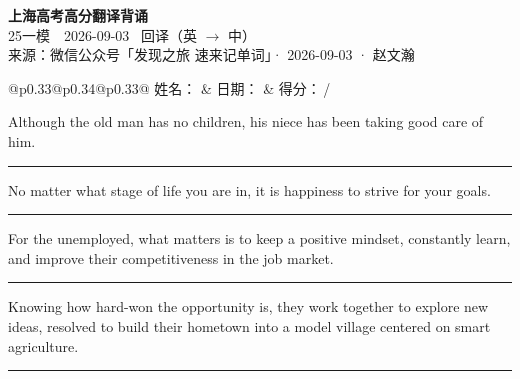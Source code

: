\documentclass[11pt,a4paper]{article}
\newcommand{\num}[1]{\makebox[1.9em][r]{#1.}\hspace{0.3em}}
\newcommand{\wline}{\noindent\rule{\linewidth}{0.4pt}}
\begin{document}
\pagestyle{plain}
\begin{center}
{\LARGE\bfseries 上海高考高分翻译背诵 }\\[0.25em]
{\large 25一模　2026-09-03 \quad\ 回译（英 $\to$ 中）}\\[0.35em]
{\footnotesize 来源：微信公众号「发现之旅 速来记单词」· 2026-09-03 · 赵文瀚}
\end{center}

\vspace{0.4em}
\noindent\begin{tabular}{@{}p{0.33\textwidth}@{}p{0.34\textwidth}@{}p{0.33\textwidth}@{}}
姓名：\underline{\hspace{2.0cm}} & 日期：\underline{\hspace{2.0cm}} & 得分：\underline{\hspace{1.4cm}}\,/ \\
\end{tabular}

\vspace{0.5em}

\vspace{0.8em}
\num{1}Although the old man has no children, his niece has been taking good care of him.

\vspace{0.25em}

\wline

\num{2}No matter what stage of life you are in, it is happiness to strive for your goals.

\vspace{0.25em}

\wline

\num{3}For the unemployed, what matters is to keep a positive mindset, constantly learn, and improve their competitiveness in the job market.

\vspace{0.25em}

\wline

\num{4}Knowing how hard-won the opportunity is, they work together to explore new ideas, resolved to build their hometown into a model village centered on smart agriculture.

\vspace{0.25em}

\wline
\end{document}
